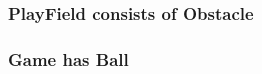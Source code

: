 \documentclass[fontsize=12pt,
               paper=a4,
               twoside=false,
               parskip=half,
               ]{scrartcl}
\begin{document}
\subsubsection{PlayField consists of Obstacle}

\subsubsection{Game has Ball}


\end{document}
